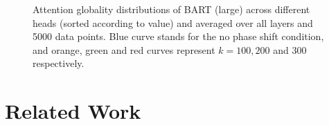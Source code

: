 \documentclass[letterpaper, 12pt]{report}
\begin{document}
\begin{figure}
    \centering
    \caption{Attention globality distributions of BART (large) across different heads (sorted according to value) and averaged over all layers and 5000 data points. Blue curve stands for the no phase shift condition, and orange, green and red curves represent $k=100,200$ and $300$ respectively.}
    \label{fig:globality_bart-large}
\end{figure}



\section{Related Work}
\label{sec:pos_related_work}
\end{document}
